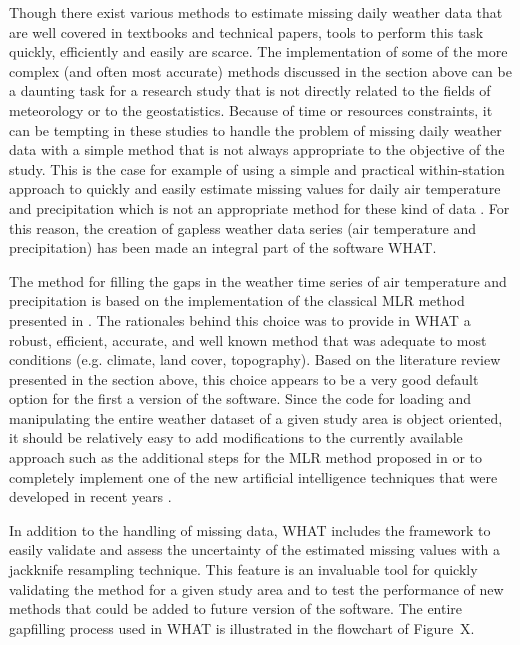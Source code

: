 \documentclass[WHATMANUAL.tex]{subfiles}
\begin{document}
Though there exist various methods to estimate missing daily weather data that are well covered in textbooks and technical papers, tools to perform this task quickly, efficiently and easily are scarce. The implementation of some of the more complex (and often most accurate) methods discussed in the section above can be a daunting task for a research study that is not directly related to the fields of meteorology or to the geostatistics. Because of time or resources constraints, it can be tempting in these studies to handle the problem of missing daily weather data with a simple method that is not always appropriate to the objective of the study. This is the case for example of using a simple and practical within-station approach to quickly and easily estimate missing values for daily air temperature and precipitation which is not an appropriate method for these kind of data \citep{eischeid_quality_1995,simolo_improving_2010,kemp_estimating_1983}. For this reason, the creation of gapless weather data series (air temperature and precipitation) has been made an integral part of the software WHAT.

The method for filling the gaps in the weather time series of air temperature and precipitation is based on the implementation of the classical MLR method presented in \cite{eischeid_creating_2000}. The rationales behind this choice was to provide in WHAT a robust, efficient, accurate, and well known method that was adequate to most conditions (e.g. climate, land cover, topography). Based on the literature review presented in the section above, this choice appears to be a very good default option for the first a version of the software. Since the code for loading and manipulating the entire weather dataset of a given study area is object oriented, it should be relatively easy to add modifications to the currently available approach such as the additional steps for the MLR method proposed in \cite{simolo_improving_2010} or to completely implement one of the new artificial intelligence techniques that were developed in recent years \citep{kashani_evaluation_2011}.

In addition to the handling of missing data, WHAT includes the framework to easily validate and assess the uncertainty of the estimated missing values with a jackknife resampling technique. This feature is an invaluable tool for quickly validating the method for a given study area and to test the performance of new methods that could be added to future version of the software. The entire gapfilling process used in WHAT is illustrated in the flowchart of Figure~X.
\end{document}
